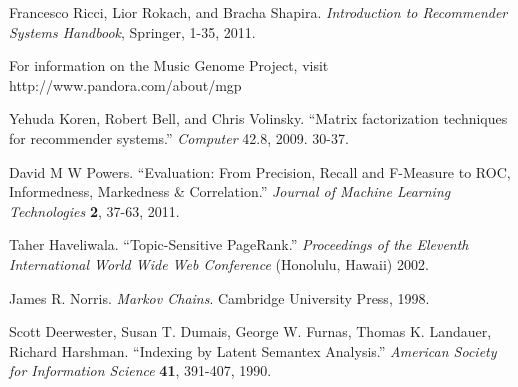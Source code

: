 \documentclass[11pt]{article}
\begin{document}
\begin{thebibliography}{9}

    Francesco Ricci, Lior Rokach, and Bracha Shapira.
    \emph{Introduction to Recommender Systems Handbook}, Springer, 1-35, 2011.

    For information on the Music Genome Project, visit
    http://www.pandora.com/about/mgp

    Yehuda Koren, Robert Bell, and Chris Volinsky.
    ``Matrix factorization techniques for recommender systems.''
    \emph{Computer} 42.8, 2009. 30-37.

    David M W Powers.
    ``Evaluation: From Precision, Recall and F-Measure to ROC, Informedness,
Markedness \& Correlation.''
    \emph{Journal of Machine Learning Technologies} \textbf{2}, 37-63, 2011.

    Taher Haveliwala.
    ``Topic-Sensitive PageRank.''
    \emph{Proceedings of the Eleventh International World Wide Web Conference}
(Honolulu, Hawaii) 2002.

    James R. Norris.
    \emph{Markov Chains}. Cambridge University Press, 1998.

    Scott Deerwester, Susan T. Dumais, George W. Furnas, Thomas K. Landauer,
Richard Harshman.
    ``Indexing by Latent Semantex Analysis.''
    \emph{American Society for Information Science} \textbf{41}, 391-407, 1990.

\end{thebibliography}
\end{document}
